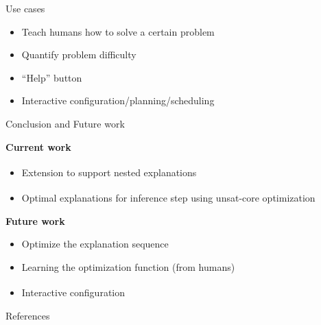 \documentclass[handout]{beamer}
\begin{document}
\begin{frame}{Use cases}
    \begin{itemize}
        \item Teach humans how to solve a certain problem
        \item Quantify problem difficulty
        \item ``Help'' button
        \item Interactive configuration/planning/scheduling
    \end{itemize}
\end{frame}

\begin{frame}{Conclusion and Future work}

    \textbf{Current work}
    \begin{itemize}
        \item Extension to support nested explanations \textsuperscript{\cite{bogaerts2020framework}}
        \item Optimal explanations for inference step using unsat-core optimization \textsuperscript{\cite{ignatiev2013quantified}}
    \end{itemize}\pause
    \vfill
    \textbf{Future work}
    \begin{itemize}
        \item Optimize the explanation sequence
        \item Learning the optimization function (from humans)
        \item Interactive configuration \textsuperscript{\cite{fox2017explainable, van2017kb, carbonnelle2019interactive}}
    \end{itemize}
    \vfill
\end{frame}



% 

\begin{frame}{References}
    \tiny 
\end{frame}
\end{document}
